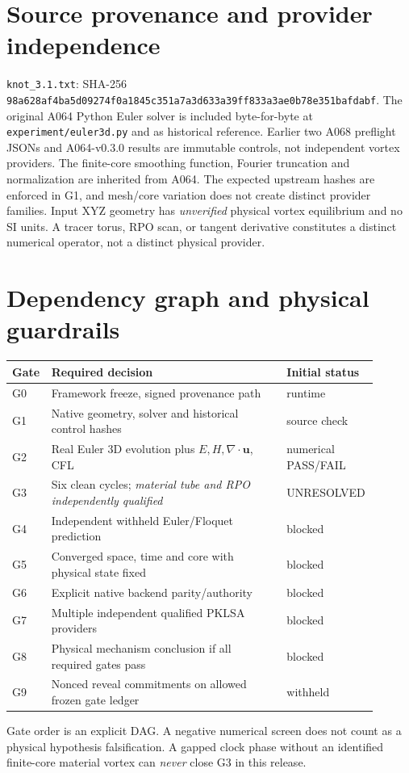 \documentclass[11pt,a4paper]{article}
\begin{document}
\section{Source provenance and provider independence}
\texttt{knot\_3.1.txt}: SHA-256 \texttt{98a628af4ba5d09274f0a1845c351a7a3d633a39ff833a3ae0b78e351bafdabf}. The original A064 Python Euler solver is included byte-for-byte at \texttt{experiment/euler3d.py} and as historical reference. Earlier two A068 preflight JSONs and A064-v0.3.0 results are immutable controls, not independent vortex providers. The finite-core smoothing function, Fourier truncation and normalization are inherited from A064. The expected upstream hashes are enforced in G1, and mesh/core variation does not create distinct provider families. Input XYZ geometry has \emph{unverified} physical vortex equilibrium and no SI units. A tracer torus, RPO scan, or tangent derivative constitutes a distinct numerical operator, not a distinct physical provider.

\section{Dependency graph and physical guardrails}
\begin{longtable}{p{0.07\linewidth}p{0.63\linewidth}p{0.20\linewidth}}
\toprule Gate & Required decision & Initial status\\\midrule
G0 & Framework freeze, signed provenance path & runtime\\
G1 & Native geometry, solver and historical control hashes & source check\\
G2 & Real Euler 3D evolution plus $E,H,\nabla\cdot\mathbf u$, CFL & numerical PASS/FAIL\\
G3 & Six clean cycles; \emph{material tube and RPO independently qualified} & UNRESOLVED\\
G4 & Independent withheld Euler/Floquet prediction & blocked\\
G5 & Converged space, time and core with physical state fixed & blocked\\
G6 & Explicit native backend parity/authority & blocked\\
G7 & Multiple independent qualified PKLSA providers & blocked\\
G8 & Physical mechanism conclusion if all required gates pass & blocked\\
G9 & Nonced reveal commitments on allowed frozen gate ledger & withheld\\\bottomrule\end{longtable}
Gate order is an explicit DAG. A negative numerical screen does not count as a physical hypothesis falsification. A gapped clock phase without an identified finite-core material vortex can \emph{never} close G3 in this release.
\end{document}

